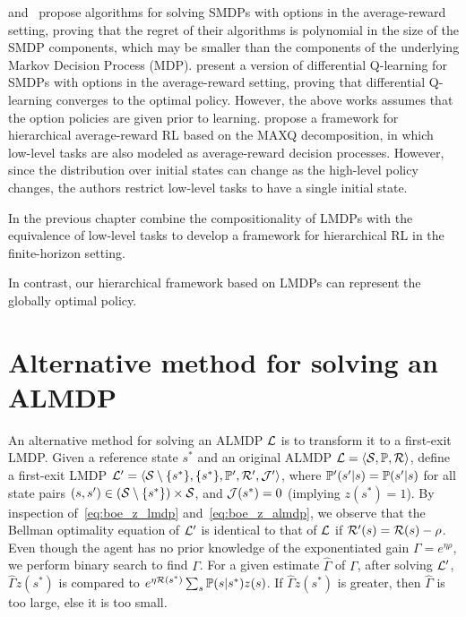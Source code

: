 \citet{Fruit2017} and~\cite{Fruit2017b} propose algorithms for solving SMDPs with options in the average-reward setting, proving that the regret of their algorithms is polynomial in the size of the SMDP components, which may be smaller than the components of the underlying Markov Decision Process (MDP).
\citet{Wan2021a} present a version of differential Q-learning for SMDPs with options in the average-reward setting, proving that differential Q-learning converges to the optimal policy.
However, the above works assumes that the option policies are given prior to learning.
\citet{Ghavamzadeh2007} propose a framework for hierarchical average-reward RL based on the MAXQ decomposition, in which low-level tasks are also modeled as average-reward decision processes.
However, since the distribution over initial states can change as the high-level policy changes, the authors restrict low-level tasks to have a single initial state.

In the previous chapter combine the compositionality of LMDPs with the equivalence of low-level tasks to develop a framework for hierarchical RL in the finite-horizon setting.

In contrast, our hierarchical framework based on LMDPs can represent the globally optimal policy.

\section{Alternative method for solving an ALMDP}

An alternative method for solving an ALMDP $\mathcal{L}$ is to transform it to a first-exit LMDP. 
Given a reference state $s^*$ and an original ALMDP $\mathcal{L}=\langle\mathcal{S},\mathbb{P},\mathcal{R}\rangle$, define a first-exit LMDP $\mathcal{L}'=\langle\mathcal{S}\setminus\{s^*\},\{s^*\}, \mathbb{P}',\mathcal{R}',\mathcal{J}'\rangle$, where $\mathbb{P}'(s'|s)=\mathbb{P}(s'|s)$ for all state pairs $(s,s')\in(\mathcal{S}\setminus\{s^*\})\times\mathcal{S}$, and $\mathcal{J}(s^*)=0$ (implying $z(s^*)=1$). By inspection of~\eqref{eq:boe_z_lmdp} and~\eqref{eq:boe_z_almdp}, we observe that the Bellman optimality equation of $\mathcal{L}'$ is identical to that of $\mathcal{L}$ if $\mathcal{R}'(s)=\mathcal{R}(s)-\rho$. Even though the agent has no prior knowledge of the exponentiated gain $\Gamma = e^{\eta\rho}$, we perform binary search to find $\Gamma$. For a given estimate $\widehat\Gamma$ of $\Gamma$, after solving $\mathcal{L}'$, $\widehat \Gamma z(s^*)$ is compared to $e^{\eta\mathcal{R}(s^*)}\sum_s\mathbb{P}(s|s^*)z(s)$. If $\widehat \Gamma z(s^*)$ is greater, then $\widehat\Gamma$ is too large, else it is too small.

